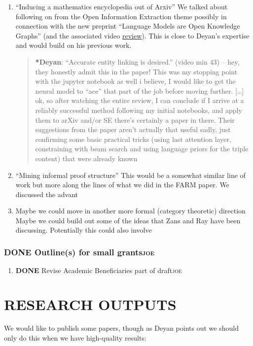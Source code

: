 \documentclass[11pt]{article}
\begin{document}
\begin{enumerate}
\item ``Inducing a mathematics encyclopedia out of Arxiv''
\label{sec:orga70e873}
We talked about following on from the Open Information Extraction
theme possibly in connection with the new preprint “Language Models
are Open Knowledge Graphs” (and the associated video \href{https://www.youtube.com/watch?v=NAJOZTNkhlI}{review}).  This is
close to Deyan’s expertise and would build on his previous work.

\begin{quote}
\textbf{*Deyan}: ``Accurate entity linking is desired.'' (video min 43) -- hey,
they honestly admit this in the paper! This was my stopping point with
the jupyter notebook as well i believe, I would like to get the neural
model to ``ace'' that part of the job before moving further. [\ldots{}]  ok,
so after watching the entire review, I can conclude if I arrive at a
reliably successful method following my initial notebooks, and apply
them to arXiv and/or SE there's certainly a paper in there. Their
suggestions from the paper aren't actually that useful sadly, just
confirming some basic practical tricks (using last attention layer,
constraining with beam search and using language priors for the triple
content) that were already known
\end{quote}
\item ``Mining informal proof structure''
\label{sec:org62413bc}
This would be a somewhat similar line of work but more along the lines
of what we did in the FARM paper.  We discussed the advant

\item Maybe we could move in another more formal (category theoretic) direction
\label{sec:orge065d1a}
Maybe we could build out some of the ideas that Zans and Ray have been
discussing. Potentially this could also involve
\end{enumerate}
\subsubsection{{\bfseries\sffamily DONE} Outline(s) for small grants\hfill{}\textsc{joe}}
\label{sec:orgc9e1e9e}
\begin{enumerate}
\item {\bfseries\sffamily DONE} Revise Academic Beneficiaries part of draft\hfill{}\textsc{joe}
\label{sec:org99be8fb}
\end{enumerate}
\section{RESEARCH OUTPUTS}
\label{sec:orge33b010}
We would like to publish some papers, though as Deyan points out we
should only do this when we have high-quality results:
\end{document}
